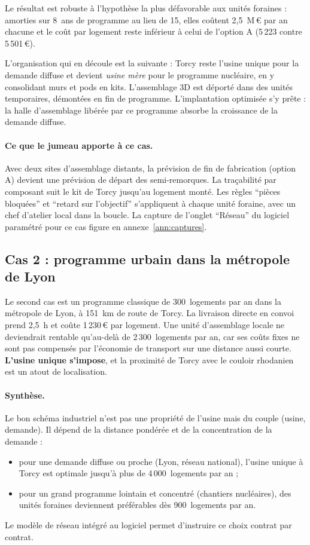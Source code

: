 \documentclass[11pt,a4paper]{article}
\newcommand{\EUR}{\,\euro}
\begin{document}
Le résultat est robuste à l'hypothèse la plus défavorable aux unités foraines : amorties sur
8~ans de programme au lieu de 15, elles coûtent 2,5~M\EUR{} par an chacune et le coût par logement
reste inférieur à celui de l'option A (5\,223 contre 5\,501\EUR).

L'organisation qui en découle est la suivante : Torcy reste l'usine unique pour la demande
diffuse et devient \emph{usine mère} pour le programme nucléaire, en y consolidant murs et pods en
kits. L'assemblage 3D est déporté dans des unités temporaires, démontées en fin de programme.
L'implantation optimisée s'y prête : la halle d'assemblage libérée par ce programme absorbe la
croissance de la demande diffuse.

\paragraph{Ce que le jumeau apporte à ce cas.} Avec deux sites d'assemblage distants, la
prévision de fin de fabrication (option A) devient une prévision de départ des semi-remorques.
La traçabilité par composant suit le kit de Torcy jusqu'au logement monté. Les règles
\enquote{pièces bloquées} et \enquote{retard sur l'objectif} s'appliquent à chaque unité
foraine, avec un chef d'atelier local dans la boucle. La capture de l'onglet \enquote{Réseau} du
logiciel paramétré pour ce cas figure en annexe~\ref{ann:captures}.

\subsection{Cas 2 : programme urbain dans la métropole de Lyon}

Le second cas est un programme classique de 300~logements par an dans la métropole de Lyon,
à 151~km de route de Torcy. La livraison directe en convoi prend 2,5~h et coûte 1\,230\EUR{} par
logement. Une unité d'assemblage locale ne deviendrait rentable qu'au-delà de 2\,300~logements par
an, car ses coûts fixes ne sont pas compensés par l'économie de transport sur une distance aussi
courte. \textbf{L'usine unique s'impose}, et la proximité de Torcy avec le couloir rhodanien est un
atout de localisation.

\paragraph{Synthèse.} Le bon schéma industriel n'est pas une propriété de l'usine mais du couple
(usine, demande). Il dépend de la distance pondérée et de la concentration de la demande :
\begin{itemize}
  \item pour une demande diffuse ou proche (Lyon, réseau national), l'usine unique à Torcy est
        optimale jusqu'à plus de 4\,000~logements par an ;
  \item pour un grand programme lointain et concentré (chantiers nucléaires), des unités foraines
        deviennent préférables dès 900~logements par an.
\end{itemize}
Le modèle de réseau intégré au logiciel permet d'instruire ce choix contrat par contrat.
\end{document}
